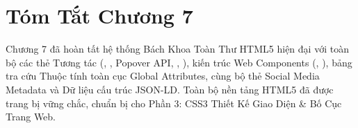 \section{Tóm Tắt Chương 7}
\begin{conceptBox}
Chương 7 đã hoàn tất hệ thống Bách Khoa Toàn Thư HTML5 hiện đại với toàn bộ các thẻ Tương tác (, , Popover API, , ), kiến trúc Web Components (, ), bảng tra cứu Thuộc tính toàn cục Global Attributes, cùng bộ thẻ Social Media Metadata và Dữ liệu cấu trúc JSON-LD. Toàn bộ nền tảng HTML5 đã được trang bị vững chắc, chuẩn bị cho Phần 3: CSS3 Thiết Kế Giao Diện \& Bố Cục Trang Web.
\end{conceptBox}
